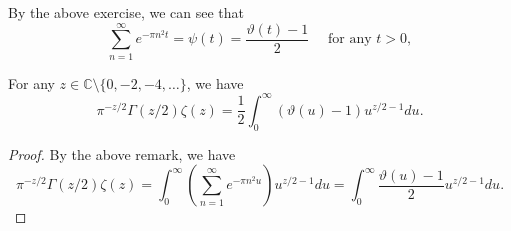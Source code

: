 \documentclass{elegantbook}
\begin{document}
\begin{note}
  By the above exercise, we can see that
  \[
    \sum_{n=1}^{\infty} e^{-\pi n^2 t} = \psi(t) = \frac{\vartheta(t) - 1}{2} \quad \text{ for any } t>0,
  \]
\end{note}

\begin{corollary}
  For any $z\in\mathbb{C}\setminus\{0,-2,-4,\ldots\}$, we have
  \[
    \pi^{-z/2} \Gamma(z/2) \zeta(z) = \frac12 \int_{0}^{\infty} \left( \vartheta(u) - 1 \right) u^{z/2 - 1} du.
  \]
\end{corollary}

\begin{proof}
  By the above remark, we have
  \[
    \pi^{-z/2} \Gamma(z/2) \zeta(z) = \int_{0}^{\infty} \left( \sum_{n=1}^{\infty} e^{-\pi n^2 u } \right) u^{z/2 - 1} du = \int_{0}^{\infty} \frac{\vartheta(u) - 1}{2} u^{z/2 - 1} du.
  \]
\end{proof}
\end{document}
